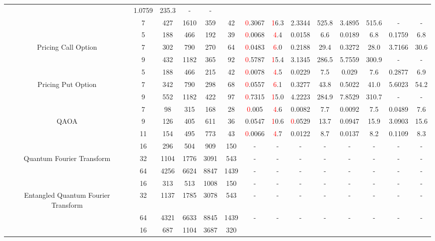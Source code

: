 \begin{table}[htb]
{\begin{tabular}{|c|c|c|c|c|c|c|c|c|c|c|c|c|c|}
 & 1.0759 & 235.3
 & - & -
 \\
 & 
7 & 427 & 1610 & 359 & 42
 & \textcolor{red}0.3067 & \textcolor{red}16.3
 & 2.3344 & 525.8
 & 3.4895 & 515.6
 & - & -
 \\
\hline
 & 
5 & 188 & 466 & 192 & 39
 & \textcolor{red}0.0068 & \textcolor{red}4.4
 & 0.0158 & 6.6
 & 0.0189 & 6.8
 & 0.1759 & 6.8
 \\
Pricing Call Option & 
7 & 302 & 790 & 270 & 64
 & \textcolor{red}0.0483 & \textcolor{red}6.0
 & 0.2188 & 29.4
 & 0.3272 & 28.0
 & 3.7166 & 30.6
 \\
 & 
9 & 432 & 1182 & 365 & 92
 & \textcolor{red}0.5787 & \textcolor{red}15.4
 & 3.1345 & 286.5
 & 5.7559 & 300.9
 & - & -
 \\
\hline
 & 
5 & 188 & 466 & 215 & 42
 & \textcolor{red}0.0078 & \textcolor{red}4.5
 & 0.0229 & 7.5
 & 0.029 & 7.6
 & 0.2877 & 6.9
 \\
Pricing Put Option & 
7 & 342 & 790 & 298 & 68
 & \textcolor{red}0.0557 & \textcolor{red}6.1
 & 0.3277 & 43.8
 & 0.5022 & 41.0
 & 5.6023 & 54.2
 \\
 & 
9 & 552 & 1182 & 422 & 97
 & \textcolor{red}0.7315 & \textcolor{red}15.0
 & 4.2223 & 284.9
 & 7.8529 & 310.7
 & - & -
 \\
\hline
 & 
7 & 98 & 315 & 168 & 28
 & \textcolor{red}0.005 & \textcolor{red}4.6
 & 0.0082 & 7.7
 & 0.0092 & 7.5
 & 0.0489 & 7.6
 \\
QAOA & 
9 & 126 & 405 & 611 & 36
 & 0.0547 & \textcolor{red}10.6
 & \textcolor{red}0.0529 & 13.7
 & 0.0947 & 15.9
 & 3.0903 & 15.6
 \\
 & 
11 & 154 & 495 & 773 & 43
 & \textcolor{red}0.0066 & \textcolor{red}4.7
 & 0.0122 & 8.7
 & 0.0137 & 8.2
 & 0.1109 & 8.3
 \\
\hline
 & 
16 & 296 & 504 & 909 & 150
 & - & -
 & - & -
 & - & -
 & - & -
 \\
Quantum Fourier Transform & 
32 & 1104 & 1776 & 3091 & 543
 & - & -
 & - & -
 & - & -
 & - & -
 \\
 & 
64 & 4256 & 6624 & 8847 & 1439
 & - & -
 & - & -
 & - & -
 & - & -
 \\
\hline
 & 
16 & 313 & 513 & 1008 & 150
 & - & -
 & - & -
 & - & -
 & - & -
 \\
Entangled Quantum Fourier Transform & 
32 & 1137 & 1785 & 3078 & 543
 & - & -
 & - & -
 & - & -
 & - & -
 \\
 & 
64 & 4321 & 6633 & 8845 & 1439
 & - & -
 & - & -
 & - & -
 & - & -
 \\
\hline
 & 
16 & 687 & 1104 & 3687 & 320

\end{tabular}}
\end{table}
